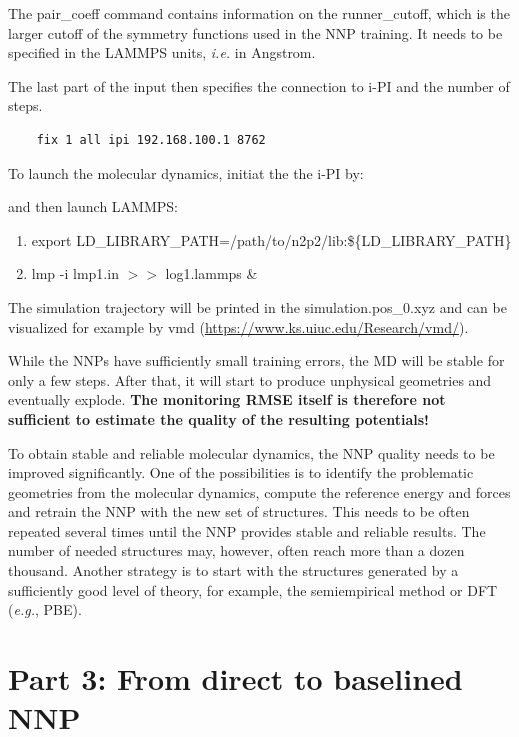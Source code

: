 \documentclass[12pt]{article}
\begin{document}
The pair\_coeff command contains information on the runner\_cutoff, which is the larger cutoff of the symmetry functions used in the NNP training. It needs to be specified in the LAMMPS units, \textit{i.e.} in Angstrom. 

The last part of the input then specifies the connection to i-PI and the number of steps.

\begin{verbatim}
    fix 1 all ipi 192.168.100.1 8762
\end{verbatim}

To launch the molecular dynamics, initiat the the i-PI by:

\begin{center}
\end{center}

and then launch LAMMPS:

\begin{enumerate}
    \item export LD\_LIBRARY\_PATH=/path/to/n2p2/lib:\$\{LD\_LIBRARY\_PATH\}
    \item lmp -i lmp1.in $>>$ log1.lammps \&
\end{enumerate}

The simulation trajectory will be printed in the simulation.pos\_0.xyz and can be visualized for example by vmd (\url{https://www.ks.uiuc.edu/Research/vmd/}). 

While the NNPs have sufficiently small training errors, the MD will be stable for only a few steps. After that, it will start to produce unphysical geometries and eventually explode. \textbf{The monitoring RMSE itself is therefore not sufficient to estimate the quality of the resulting potentials!} 

To obtain stable and reliable molecular dynamics, the NNP quality needs to be improved significantly. One of the possibilities is to identify the problematic geometries from the molecular dynamics, compute the reference energy and forces and retrain the NNP with the new set of structures. This needs to be often repeated several times until the NNP provides stable and reliable results. The number of needed structures may, however, often reach more than a dozen thousand. Another strategy is to start with the structures generated by a sufficiently good level of theory, for example, the semiempirical method or DFT (\textit{e.g.}, PBE). 

\section{Part 3: From direct to baselined NNP}
%
\end{document}
